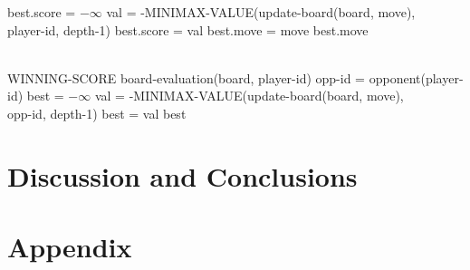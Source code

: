 \documentclass[a4paper,11pt]{article}
\begin{document}
\begin{algorithmic}
  \State best.score = $-\infty$
    \State val = -MINIMAX-VALUE(update-board(board, move), \\
    \hspace{160pt} player-id, depth-1)
      \State best.score = val
      \State best.move = move
    \EndIf
  \EndFor
  \State \Return best.move
\EndFunction

\\

  \State \Return WINNING-SCORE
  \State \Return board-evaluation(board, player-id)
\Else
  \State opp-id = opponent(player-id)
  \State best = $-\infty$
    \State val = -MINIMAX-VALUE(update-board(board, move), \\
    \hspace{180pt} opp-id, depth-1)
      \State best = val
    \EndIf
  \EndFor
  \State \Return best
\EndIf
\EndFunction
\end{algorithmic}




\section{Discussion and Conclusions}





\section{Appendix}


\end{document}
